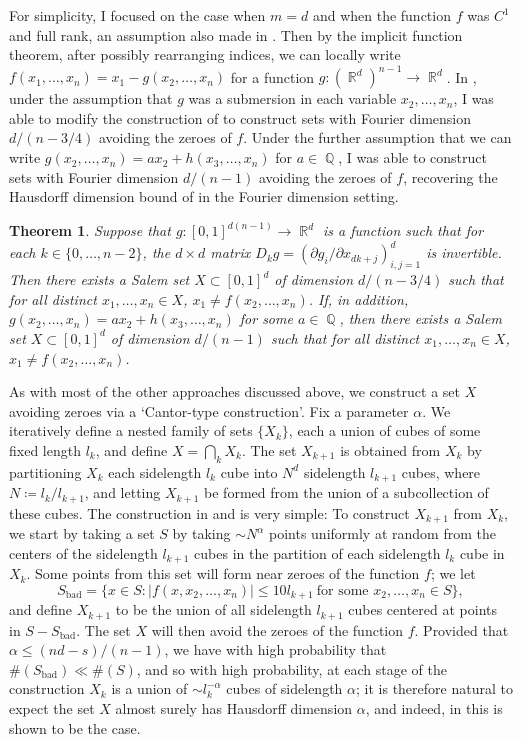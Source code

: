 \documentclass[11pt]{article}
\newtheorem*{theorem}{Theorem}
\DeclareMathOperator{\QQ}{\mathbb{Q}}
\DeclareMathOperator{\RR}{\mathbb{R}}
\begin{document}
For simplicity, I focused on the case when $m = d$ and when the function $f$ was $C^1$ and full rank, an assumption also made in \cite{FraserPramanik}. Then by the implicit function theorem, after possibly rearranging indices, we can locally write $f(x_1,\dots,x_n) = x_1 - g(x_2,\dots,x_n)$ for a function $g: (\RR^d)^{n-1} \to \RR^d$. In \cite{DensonFourier}, under the assumption that $g$ was a submersion in each variable $x_2,\dots,x_n$, I was able to modify the construction of \cite{FraserPramanik} to construct sets with Fourier dimension $d/(n-3/4)$ avoiding the zeroes of $f$. Under the further assumption that we can write $g(x_2,\dots,x_n) = ax_2 + h(x_3,\dots,x_n)$ for $a \in \QQ$, I was able to construct sets with Fourier dimension $d/(n-1)$ avoiding the zeroes of $f$, recovering the Hausdorff dimension bound of \cite{FraserPramanik} in the Fourier dimension setting.

\begin{theorem} \cite{DensonFourier}
	Suppose that $g: [0,1]^{d(n-1)} \to \RR^d$ is a function such that for each $k \in \{ 0, \dots, n-2 \}$, the $d \times d$ matrix $D_k g = ( \partial g_i / \partial x_{dk+j} )_{i,j = 1}^d$ is invertible. Then there exists a Salem set $X \subset [0,1]^d$ of dimension $d/(n-3/4)$ such that for all distinct $x_1,\dots,x_n \in X$, $x_1 \neq f(x_2,\dots,x_n)$. If, in addition, $g(x_2,\dots,x_n) = ax_2 + h(x_3,\dots,x_n)$ for some $a \in \QQ$, then there exists a Salem set $X \subset [0,1]^d$ of dimension $d/(n-1)$ such that for all distinct $x_1,\dots,x_n \in X$, $x_1 \neq f(x_2,\dots,x_n)$.
\end{theorem}

As with most of the other approaches discussed above, we construct a set $X$ avoiding zeroes via a `Cantor-type construction'. Fix a parameter $\alpha$. We iteratively define a nested family of sets $\{ X_k \}$, each a union of cubes of some fixed length $l_k$, and define $X = \bigcap_k X_k$. The set $X_{k+1}$ is obtained from $X_k$ by partitioning $X_k$ each sidelength $l_k$ cube into $N^d$ sidelength $l_{k+1}$ cubes, where $N \coloneqq l_k / l_{k+1}$, and letting $X_{k+1}$ be formed from the union of a subcollection of these cubes. The construction in \cite{DensonPramanikZahl} and \cite{DensonFourier} is very simple: To construct $X_{k+1}$ from $X_k$, we start by taking a set $S$ by taking $\sim N^\alpha$ points uniformly at random from the centers of the sidelength $l_{k+1}$ cubes in the partition of each sidelength $l_k$ cube in $X_k$. Some points from this set will form near zeroes of the function $f$; we let
%
\[ S_{\text{bad}} = \{ x \in S : |f(x,x_2,\dots,x_n)| \leq 10 l_{k+1}\ \text{for some $x_2,\dots,x_n \in S$} \}, \]
%
and define $X_{k+1}$ to be the union of all sidelength $l_{k+1}$ cubes centered at points in $S - S_{\text{bad}}$. The set $X$ will then avoid the zeroes of the function $f$. Provided that $\alpha \leq (nd - s)/(n-1)$, we have with high probability that $\#(S_{\text{bad}}) \ll \#(S)$, and so with high probability, at each stage of the construction $X_k$ is a union of $\sim l_k^{-\alpha}$ cubes of sidelength $\alpha$; it is therefore natural to expect the set $X$ almost surely has Hausdorff dimension $\alpha$, and indeed, in \cite{DensonPramanikZahl} this is shown to be the case.
\end{document}
